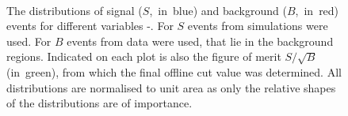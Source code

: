 \newpage
\begin{figure}[htb]
\ContinuedFloat
\centering
{}%
\\%
\caption[Cut optimisation for \bsphimumu]{The distributions of signal ($S$,~in~blue) and background ($B$,~in~red) events for different variables -. For $S$ events from \bsphimumu simulations were used. For $B$ events from data were used, that lie in the background regions. Indicated on each plot is also the figure of merit $S/\sqrt{B}$ (in~green), from which the final offline cut value was determined. All distributions are normalised to unit area as only the relative shapes of the distributions are of importance.}
\label{fig:cutoptimisation}
\end{figure}

\doublepage

\doublepage
